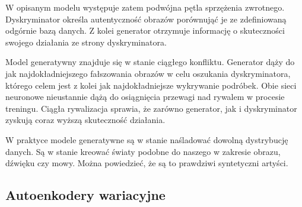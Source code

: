   W opisanym modelu występuje zatem podwójna pętla sprzężenia zwrotnego. Dyskryminator określa autentyczność obrazów porównująć je ze zdefiniowaną odgórnie bazą danych. Z kolei generator otrzymuje informację o skuteczności swojego działania ze strony dyskryminatora.

  Model generatywny znajduje się w stanie ciągłego konfliktu. Generator dąży do jak najdokładniejszego fałszowania obrazów w celu oszukania dyskryminatora, którego celem jest z kolei jak najdokładniejsze wykrywanie podróbek. Obie sieci neuronowe nieustannie dążą do osiągnięcia przewagi nad rywalem w procesie treningu. Ciągła rywalizacja sprawia, że zarówno generator, jak i dyskryminator zyskują coraz wyższą skuteczność działania.

  W praktyce modele generatywne są w stanie naśladować dowolną dystrybucję danych. Są w stanie kreować światy podobne do naszego w zakresie obrazu, dźwięku czy mowy. Można powiedzieć, że są to prawdziwi syntetyczni artyści.

  \subsection{Autoenkodery wariacyjne}
  \label{autoenkodery_wariacyjne}
